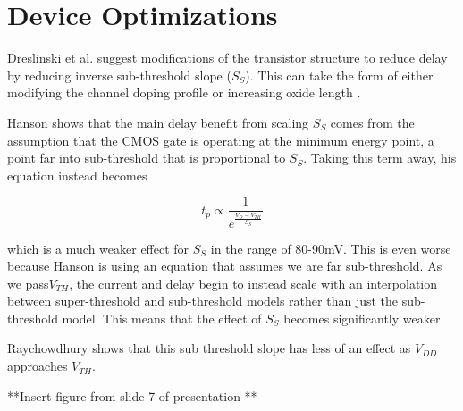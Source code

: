
\section{Device Optimizations}
Dreslinski et al. \cite{Dreslinski:2010ez} suggest modifications of the transistor structure to reduce delay by reducing inverse sub-threshold slope ($S_S$). This can take the form of either modifying the channel doping profile \cite{Paul:2004cx} or increasing oxide length \cite{Hanson:2007uu}.

Hanson shows that the main delay benefit from scaling $S_S$ comes from the assumption that the CMOS gate is operating at the minimum energy point, a point far into sub-threshold that is proportional to $S_S$. Taking this term away, his equation instead becomes

\begin{equation}
t_p \propto \frac{1}{e^\frac{V_{D}-V_{TH}}{S_S}}
\end{equation} 

which is a much weaker effect for $S_S$ in the range of 80-90mV. This is even worse because Hanson is using an equation that assumes we are far sub-threshold. As we pass$ V_{TH}$, the current and delay begin to instead scale with an interpolation between super-threshold and sub-threshold models rather than just the sub-threshold model. This means that the effect of $S_S$ becomes significantly weaker.

 Raychowdhury \cite{Raychowdhury:2006fu} shows that this sub threshold slope has less of an effect as $V_{DD}$ approaches $V_{TH}$.
 
 **Insert figure from slide 7 of presentation **
 